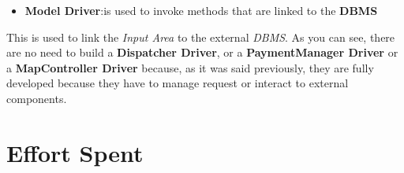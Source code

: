 \documentclass[11pt,a4paper]{report}
\begin{document}
\begin{itemize}
	\item \textbf{Model Driver}:is used to invoke methods that are linked to the \textbf{DBMS}
\end{itemize}
This is used to link the \textit{Input Area} to the external \textit{DBMS}.
As you can see, there are no need to build a \textbf{Dispatcher Driver}, or a \textbf{PaymentManager Driver} or a \textbf{MapController Driver} because, as it was said previously, they are fully developed because they have to manage request or interact to external components.
\chapter{Effort Spent}
\end{document}
